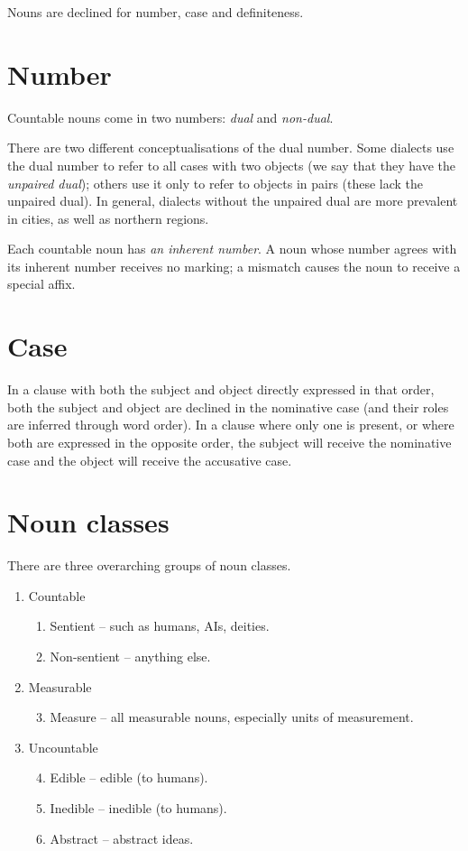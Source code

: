 \documentclass{book}
\begin{document}
Nouns are declined for number, case and definiteness.

\section{Number}

Countable nouns come in two numbers: \emph{dual} and \emph{non-dual}.

There are two different conceptualisations of the dual number. Some dialects use the dual number to refer to all cases with two objects (we say that they have the \emph{unpaired dual}); others use it only to refer to objects in pairs (these lack the unpaired dual). In general, dialects without the unpaired dual are more prevalent in cities, as well as northern regions.

Each countable noun has \emph{an inherent number}. A noun whose number agrees with its inherent number receives no marking; a mismatch causes the noun to receive a special affix.

\section{Case}

In a clause with both the subject and object directly expressed in that order, both the subject and object are declined in the nominative case (and their roles are inferred through word order). In a clause where only one is present, or where both are expressed in the opposite order, the subject will receive the nominative case and the object will receive the accusative case.

\section{Noun classes}

There are three overarching groups of noun classes.

\begin{enumerate}
  \item Countable
  \begin{enumerate}
      \item Sentient -- such as humans, AIs, deities.
      \item Non-sentient -- anything else.
  \end{enumerate}
  \item Measurable
  \begin{enumerate}
      \setcounter{enumi}{2}
      \item Measure -- all measurable nouns, especially units of measurement.
  \end{enumerate}
  \item Uncountable
  \begin{enumerate}
      \setcounter{enumi}{3}
      \item Edible -- edible (to humans).
      \item Inedible -- inedible (to humans).
      \item Abstract -- abstract ideas.
  \end{enumerate}
\end{enumerate}
\end{document}
